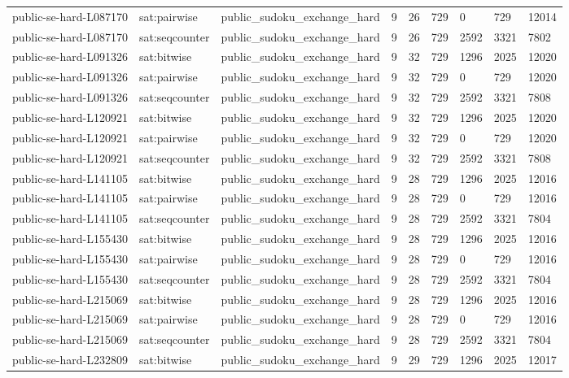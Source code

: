\begin{tabular}{lllllllll}
public-se-hard-L087170 & sat:pairwise & public\_sudoku\_exchange\_hard & 9 & 26 & 729 & 0 & 729 & 12014 \\
public-se-hard-L087170 & sat:seqcounter & public\_sudoku\_exchange\_hard & 9 & 26 & 729 & 2592 & 3321 & 7802 \\
public-se-hard-L091326 & sat:bitwise & public\_sudoku\_exchange\_hard & 9 & 32 & 729 & 1296 & 2025 & 12020 \\
public-se-hard-L091326 & sat:pairwise & public\_sudoku\_exchange\_hard & 9 & 32 & 729 & 0 & 729 & 12020 \\
public-se-hard-L091326 & sat:seqcounter & public\_sudoku\_exchange\_hard & 9 & 32 & 729 & 2592 & 3321 & 7808 \\
public-se-hard-L120921 & sat:bitwise & public\_sudoku\_exchange\_hard & 9 & 32 & 729 & 1296 & 2025 & 12020 \\
public-se-hard-L120921 & sat:pairwise & public\_sudoku\_exchange\_hard & 9 & 32 & 729 & 0 & 729 & 12020 \\
public-se-hard-L120921 & sat:seqcounter & public\_sudoku\_exchange\_hard & 9 & 32 & 729 & 2592 & 3321 & 7808 \\
public-se-hard-L141105 & sat:bitwise & public\_sudoku\_exchange\_hard & 9 & 28 & 729 & 1296 & 2025 & 12016 \\
public-se-hard-L141105 & sat:pairwise & public\_sudoku\_exchange\_hard & 9 & 28 & 729 & 0 & 729 & 12016 \\
public-se-hard-L141105 & sat:seqcounter & public\_sudoku\_exchange\_hard & 9 & 28 & 729 & 2592 & 3321 & 7804 \\
public-se-hard-L155430 & sat:bitwise & public\_sudoku\_exchange\_hard & 9 & 28 & 729 & 1296 & 2025 & 12016 \\
public-se-hard-L155430 & sat:pairwise & public\_sudoku\_exchange\_hard & 9 & 28 & 729 & 0 & 729 & 12016 \\
public-se-hard-L155430 & sat:seqcounter & public\_sudoku\_exchange\_hard & 9 & 28 & 729 & 2592 & 3321 & 7804 \\
public-se-hard-L215069 & sat:bitwise & public\_sudoku\_exchange\_hard & 9 & 28 & 729 & 1296 & 2025 & 12016 \\
public-se-hard-L215069 & sat:pairwise & public\_sudoku\_exchange\_hard & 9 & 28 & 729 & 0 & 729 & 12016 \\
public-se-hard-L215069 & sat:seqcounter & public\_sudoku\_exchange\_hard & 9 & 28 & 729 & 2592 & 3321 & 7804 \\
public-se-hard-L232809 & sat:bitwise & public\_sudoku\_exchange\_hard & 9 & 29 & 729 & 1296 & 2025 & 12017 \\

\end{tabular}
